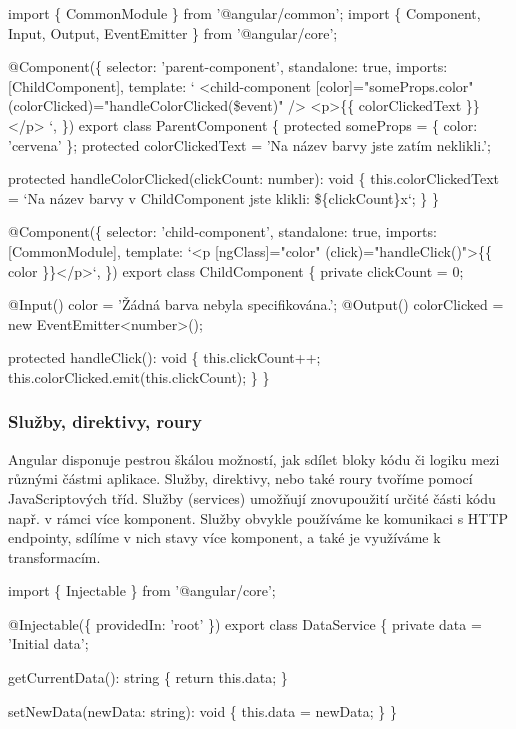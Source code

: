 \begin{prog}
import \{ CommonModule \} from '@angular/common';
import \{ Component, Input, Output, EventEmitter \} from '@angular/core';

@Component(\{
  selector: 'parent-component',
  standalone: true,
  imports: [ChildComponent],
  template: `
    <child-component 
      [color]="someProps.color" 
      (colorClicked)="handleColorClicked(\$event)" 
    />
    <p>\{\{ colorClickedText \}\}</p>
  `,
\})
export class ParentComponent \{
  protected someProps = \{ color: 'cervena' \};
  protected colorClickedText = 'Na název barvy jste zatím neklikli.';

  protected handleColorClicked(clickCount: number): void \{
    this.colorClickedText = `Na název barvy 
      v ChildComponent jste klikli: \$\{clickCount\}x`;
  \}
\}

@Component(\{
  selector: 'child-component',
  standalone: true,
  imports: [CommonModule],
  template: `<p [ngClass]="color" (click)="handleClick()">\{\{ color \}\}</p>`,
\})
export class ChildComponent \{
  private clickCount = 0;

  @Input() color = 'Žádná barva nebyla specifikována.';
  @Output() colorClicked = new EventEmitter<number>();

  protected handleClick(): void \{
    this.clickCount++;
    this.colorClicked.emit(this.clickCount);
  \}
\}
\end{prog}

\subsubsection{Služby, direktivy, roury}

Angular disponuje pestrou škálou možností, jak sdílet bloky kódu či logiku mezi různými částmi aplikace. Služby, direktivy, nebo také roury tvoříme pomocí JavaScriptových tříd. 
Služby (services) umožňují znovupoužití určité části kódu např. v rámci více komponent. 
Služby obvykle používáme ke komunikaci s HTTP endpointy, sdílíme v nich stavy více komponent, a také je využíváme k transformacím.\cite{angulardev,learningangular}

\begin{prog}
import \{ Injectable \} from '@angular/core';
  
@Injectable(\{ providedIn: 'root' \})
export class DataService \{
  private data = 'Initial data';

  getCurrentData(): string \{
    return this.data;
  \}
      
  setNewData(newData: string): void \{
    this.data = newData;
  \}
\}
\end{prog}


